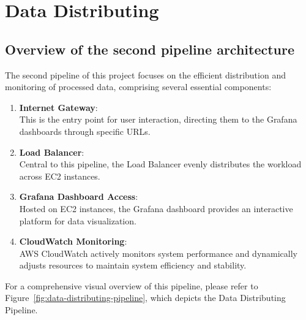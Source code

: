 \documentclass[12pt,oneside]{book} %
\begin{document}
\newpage
\section{Data Distributing}

\subsection{Overview of the second pipeline architecture}
The second pipeline of this project focuses on the efficient distribution and
monitoring of processed data, comprising several essential components:

\begin{enumerate}
    \item \textbf{Internet Gateway}: \\
          This is the entry point for user interaction, directing them to the Grafana dashboards through specific URLs.

    \item \textbf{Load Balancer}: \\
          Central to this pipeline, the Load Balancer evenly distributes the workload across EC2 instances.

    \item \textbf{Grafana Dashboard Access}: \\
          Hosted on EC2 instances, the Grafana dashboard provides an interactive platform for data visualization.

    \item \textbf{CloudWatch Monitoring}: \\
          AWS CloudWatch actively monitors system performance and dynamically adjusts resources to maintain system efficiency and stability.
\end{enumerate}

For a comprehensive visual overview of this pipeline, please refer to
Figure~\ref{fig:data-distributing-pipeline}, which depicts the Data
Distributing Pipeline.
\end{document}

